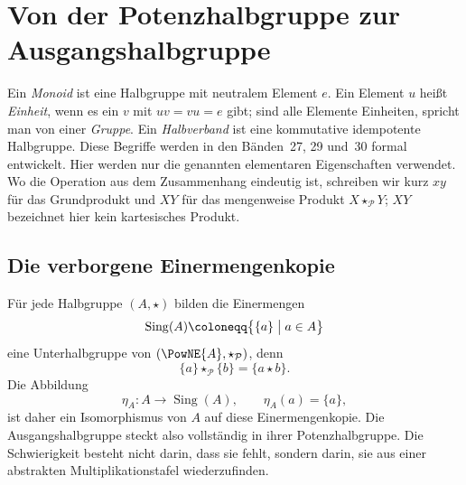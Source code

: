 \documentclass[main.tex]{subfiles}
\begin{document}
\chapter{Von der Potenzhalbgruppe zur Ausgangshalbgruppe}

\begin{remark}
Ein \emph{Monoid} ist eine Halbgruppe mit neutralem Element \(e\).  Ein
Element \(u\) heißt \emph{Einheit}, wenn es ein \(v\) mit
\(uv=vu=e\) gibt; sind alle Elemente Einheiten, spricht man von einer
\emph{Gruppe}.  Ein \emph{Halbverband} ist eine kommutative idempotente
Halbgruppe.  Diese Begriffe werden in den Bänden~27, 29 und~30 formal
entwickelt.  Hier werden nur die genannten elementaren Eigenschaften
verwendet.  Wo die Operation aus dem Zusammenhang eindeutig ist, schreiben
wir kurz \(xy\) für das Grundprodukt und \(XY\) für das mengenweise Produkt
\(X\star_{\mathcal P}Y\); \(XY\) bezeichnet hier kein kartesisches Produkt.
\end{remark}

\section{Die verborgene Einermengenkopie}

Für jede Halbgruppe \((A,\star)\) bilden die Einermengen
\[
  \operatorname{Sing}(A)
  \coloneqq
  \bigl\{\{a\}\bigm|a\in A\bigr\}
\]
eine Unterhalbgruppe von \((\PowNE{A},\star_{\mathcal P})\), denn
\[
  \{a\}\star_{\mathcal P}\{b\}=\{a\star b\}.
\]
Die Abbildung
\[
  \eta_A\colon A\to\operatorname{Sing}(A),
  \qquad
  \eta_A(a)=\{a\},
\]
ist daher ein Isomorphismus von \(A\) auf diese Einermengenkopie.  Die
Ausgangshalbgruppe steckt also vollständig in ihrer Potenzhalbgruppe.  Die
Schwierigkeit besteht nicht darin, dass sie fehlt, sondern darin, sie aus
einer abstrakten Multiplikationstafel wiederzufinden.
\end{document}
